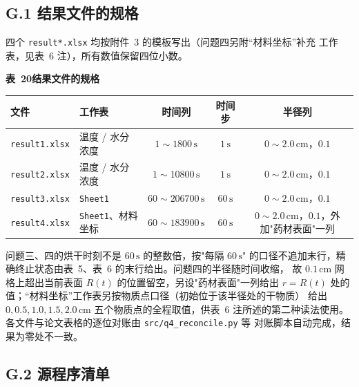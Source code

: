 \documentclass[withoutpreface,bwprint]{cumcmthesis} %
\begin{document}
\begin{appendices}
\subsection*{G.1 结果文件的规格}

四个 \texttt{result*.xlsx} 均按附件~3 的模板写出（问题四另附``材料坐标''补充
工作表，见表~6 注），所有数值保留四位小数。

\begin{table}[htbp]
\centering
\begin{minipage}{0.94\textwidth}
\centering\small
\textbf{表~20\quad 结果文件的规格}\\[3pt]
\begin{tabular}{llccc}
\toprule
文件 & 工作表 & 时间列 & 时间步 & 半径列 \\
\midrule
\texttt{result1.xlsx} & 温度 / 水分浓度 & $1\sim1800\,\mathrm{s}$ & $1\,\mathrm{s}$
 & $0\sim2.0\,\mathrm{cm}$，$0.1$ \\
\texttt{result2.xlsx} & 温度 / 水分浓度 & $1\sim10800\,\mathrm{s}$ & $1\,\mathrm{s}$
 & $0\sim2.0\,\mathrm{cm}$，$0.1$ \\
\texttt{result3.xlsx} & \texttt{Sheet1} & $60\sim206700\,\mathrm{s}$ & $60\,\mathrm{s}$
 & $0\sim2.0\,\mathrm{cm}$，$0.1$ \\
\texttt{result4.xlsx} & \texttt{Sheet1}、材料坐标 & $60\sim183900\,\mathrm{s}$ & $60\,\mathrm{s}$
 & $0\sim2.0\,\mathrm{cm}$，$0.1$，外加"药材表面"一列 \\
\bottomrule
\end{tabular}
\end{minipage}
\end{table}

\noindent 问题三、四的烘干时刻不是 $60\,\mathrm{s}$ 的整数倍，按"每隔 $60\,\mathrm{s}$"
的口径不追加末行，精确终止状态由表~5、表~6 的末行给出。问题四的半径随时间收缩，
故 $0.1\,\mathrm{cm}$ 网格上超出当前表面 $R(t)$ 的位置留空，另设"药材表面"一列给出
$r=R(t)$ 处的值；``材料坐标''工作表另按物质点口径（初始位于该半径处的干物质）
给出 $0,0.5,1.0,1.5,2.0\,\mathrm{cm}$ 五个物质点的全程取值，供表~6 注所述的第二种读法使用。各文件与论文表格的逐位对账由 \texttt{src/q4\_reconcile.py} 等
对账脚本自动完成，结果为零处不一致。

\subsection*{G.2 源程序清单}


\end{appendices}
\end{document}
